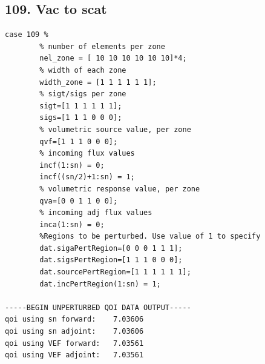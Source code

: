 \documentclass{article}
\begin{document}
\subsection{109. Vac to scat}
\begin{verbatim}
case 109 %
        % number of elements per zone
        nel_zone = [ 10 10 10 10 10 10]*4;
        % width of each zone
        width_zone = [1 1 1 1 1 1];
        % sigt/sigs per zone
        sigt=[1 1 1 1 1 1];
        sigs=[1 1 1 0 0 0];
        % volumetric source value, per zone
        qvf=[1 1 1 0 0 0];
        % incoming flux values
        incf(1:sn) = 0;
        incf((sn/2)+1:sn) = 1;
        % volumetric response value, per zone
        qva=[0 0 1 1 0 0];
        % incoming adj flux values
        inca(1:sn) = 0;
        %Regions to be perturbed. Use value of 1 to specify
        dat.sigaPertRegion=[0 0 0 1 1 1];
        dat.sigsPertRegion=[1 1 1 0 0 0];
        dat.sourcePertRegion=[1 1 1 1 1 1];
        dat.incPertRegion(1:sn) = 1; 
        
-----BEGIN UNPERTURBED QOI DATA OUTPUT----- 
qoi using sn forward: 	 7.03606 
qoi using sn adjoint: 	 7.03606 
qoi using VEF forward: 	 7.03561 
qoi using VEF adjoint: 	 7.03561 
\end{verbatim}
\end{document}
